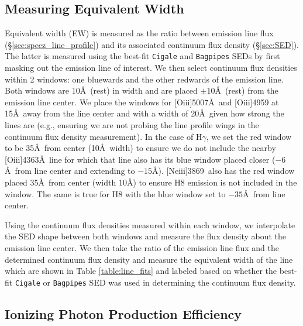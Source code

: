\documentclass[twocolumn,tight,times,linenumbers]{aastex631}
\newcommand{\hgamma}{H$\gamma$}
\newcommand{\oiii}{[O{\sc iii}]}
\newcommand{\neiii}{[Ne{\sc iii}]}
\begin{document}
	
		
	\subsection{Measuring Equivalent Width}
	\label{sec:measure_ew}
	Equivalent width (EW) is measured as the ratio between emission line flux (\S\ref{sec:specz_line_profile}) and its associated continuum flux density (\S\ref{sec:SED}). The latter is measured using the best-fit \texttt{Cigale} and \texttt{Bagpipes} SEDs by first masking out the emission line of interest. We then select continuum flux densities within 2 windows: one bluewards and the other redwards of the emission line. Both windows are 10\AA~(rest) in width and are placed $\pm10$\AA~(rest) from the emission line center. We place the windows for \oiii5007\AA~and \oiii4959 at 15\AA~away from the line center and with a width of 20\AA~given how strong the lines are (e.g., ensuring we are not probing the line profile wings in the continuum flux density measurement).  In the case of \hgamma, we set the red window to be 35\AA~from center (10\AA~width) to ensure we do not include the nearby \oiii4363\AA~line for which that line also has its blue window placed closer ($-6$\AA~from line center and extending to $-15$\AA). \neiii3869~also has the red window placed 35\AA~from center (width 10\AA) to ensure H8 emission is not included in the window. The same is true for H8 with the blue window set to $-35$\AA~from line center.
	
	Using the continuum flux densities measured within each window, we interpolate the SED shape between both windows and measure the flux density about the emission line center. We then take the ratio of the emission line flux and the determined continuum flux density and measure the equivalent width of the line which are shown in Table \ref{table:line_fits} and labeled based on whether the best-fit \texttt{Cigale} or \texttt{Bagpipes} SED was used in determining the continuum flux density.
	
	\subsection{Ionizing Photon Production Efficiency}
	\label{sec:xi_ion}
	
\end{document}
